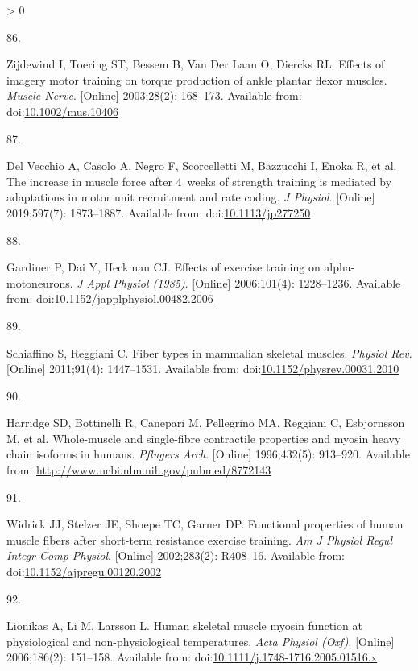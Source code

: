 \documentclass[twoside,10pt]{gihclass} %
\newlength{\cslhangindent}
\newlength{\csllabelwidth}
\newenvironment{CSLReferences}[3] %
 {%
  \setlength{\parindent}{0pt}
  \ifodd #1 \everypar{\setlength{\hangindent}{\cslhangindent}}\ignorespaces\fi
  \ifnum #2 > 0
  \setlength{\parskip}{#2\baselineskip}
  \fi
 }%
 {}
\newcommand{\CSLLeftMargin}[1]{\parbox[t]{\maxof{\widthof{#1}}{\csllabelwidth}}{#1}}
\newcommand{\CSLRightInline}[1]{\parbox[t]{\linewidth}{#1}}
\begin{document}
\begin{CSLReferences}{0}{0}
\leavevmode\hypertarget{ref-RN2767}{}%
\CSLLeftMargin{86. }
\CSLRightInline{Zijdewind I, Toering ST, Bessem B, Van Der Laan O, Diercks RL. Effects of imagery motor training on torque production of ankle plantar flexor muscles. \emph{Muscle Nerve}. {[}Online{]} 2003;28(2): 168--173. Available from: doi:\href{https://doi.org/10.1002/mus.10406}{10.1002/mus.10406}}

\leavevmode\hypertarget{ref-RN2763}{}%
\CSLLeftMargin{87. }
\CSLRightInline{Del Vecchio A, Casolo A, Negro F, Scorcelletti M, Bazzucchi I, Enoka R, et al. The increase in muscle force after 4~weeks of strength training is mediated by adaptations in motor unit recruitment and rate coding. \emph{J Physiol}. {[}Online{]} 2019;597(7): 1873--1887. Available from: doi:\href{https://doi.org/10.1113/jp277250}{10.1113/jp277250}}

\leavevmode\hypertarget{ref-RN2764}{}%
\CSLLeftMargin{88. }
\CSLRightInline{Gardiner P, Dai Y, Heckman CJ. Effects of exercise training on alpha-motoneurons. \emph{J Appl Physiol (1985)}. {[}Online{]} 2006;101(4): 1228--1236. Available from: doi:\href{https://doi.org/10.1152/japplphysiol.00482.2006}{10.1152/japplphysiol.00482.2006}}

\leavevmode\hypertarget{ref-RN819}{}%
\CSLLeftMargin{89. }
\CSLRightInline{Schiaffino S, Reggiani C. Fiber types in mammalian skeletal muscles. \emph{Physiol Rev}. {[}Online{]} 2011;91(4): 1447--1531. Available from: doi:\href{https://doi.org/10.1152/physrev.00031.2010}{10.1152/physrev.00031.2010}}

\leavevmode\hypertarget{ref-RN846}{}%
\CSLLeftMargin{90. }
\CSLRightInline{Harridge SD, Bottinelli R, Canepari M, Pellegrino MA, Reggiani C, Esbjornsson M, et al. Whole-muscle and single-fibre contractile properties and myosin heavy chain isoforms in humans. \emph{Pflugers Arch}. {[}Online{]} 1996;432(5): 913--920. Available from: \url{http://www.ncbi.nlm.nih.gov/pubmed/8772143}}

\leavevmode\hypertarget{ref-RN2169}{}%
\CSLLeftMargin{91. }
\CSLRightInline{Widrick JJ, Stelzer JE, Shoepe TC, Garner DP. Functional properties of human muscle fibers after short-term resistance exercise training. \emph{Am J Physiol Regul Integr Comp Physiol}. {[}Online{]} 2002;283(2): R408--16. Available from: doi:\href{https://doi.org/10.1152/ajpregu.00120.2002}{10.1152/ajpregu.00120.2002}}

\leavevmode\hypertarget{ref-RN849}{}%
\CSLLeftMargin{92. }
\CSLRightInline{Lionikas A, Li M, Larsson L. Human skeletal muscle myosin function at physiological and non-physiological temperatures. \emph{Acta Physiol (Oxf)}. {[}Online{]} 2006;186(2): 151--158. Available from: doi:\href{https://doi.org/10.1111/j.1748-1716.2005.01516.x}{10.1111/j.1748-1716.2005.01516.x}}


\end{CSLReferences}
\end{document}
